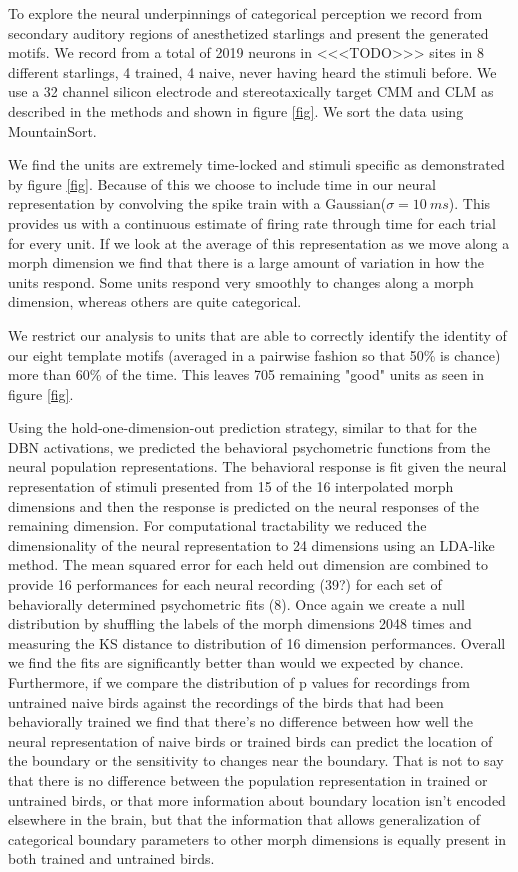 

To explore the neural underpinnings of categorical perception we record from secondary auditory regions of anesthetized starlings and present the generated motifs. We record from a total of 2019 neurons in <<<TODO>>> sites in 8 different starlings, 4 trained, 4 naive, never having heard the stimuli before. We use a 32 channel silicon electrode and stereotaxically target \ac{CMM} and \ac{CLM} as described in the methods and shown in figure \ref{fig}. We sort the data using MountainSort\cite{mountainsort}. 

We find the units are extremely time-locked and stimuli specific as demonstrated by figure \ref{fig}. Because of this we choose to include time in our neural representation by convolving the spike train with a Gaussian($\sigma = \SI{10}{ms}$). This provides us with a continuous estimate of firing rate through time for each trial for every unit. If we look at the average of this representation as we move along a morph dimension we find that there is a large amount of variation in how the units respond. Some units respond very smoothly to changes along a morph dimension, whereas others are quite categorical.

We restrict our analysis to units that are able to correctly identify the identity of our eight template motifs (averaged in a pairwise fashion so that 50\% is chance) more than 60\% of the time. This leaves 705 remaining "good" units as seen in figure \ref{fig}.

Using the hold-one-dimension-out prediction strategy, similar to that for the DBN activations, we predicted the behavioral psychometric functions from the neural population representations. The behavioral response is fit given the neural representation of stimuli presented from 15 of the 16 interpolated morph dimensions and then the response is predicted on the neural responses of the remaining dimension. For computational tractability we reduced the dimensionality of the neural representation to 24 dimensions using an LDA-like method. The mean squared error for each held out dimension are combined to provide 16 performances for each neural recording (39?) for each set of behaviorally determined psychometric fits (8). Once again we create a null distribution by shuffling the labels of the morph dimensions 2048 times and measuring the KS distance to distribution of 16 dimension performances. Overall we find the fits are significantly better than would we expected by chance. Furthermore, if we compare the distribution of p values for recordings from untrained naive birds against the recordings of the birds that had been behaviorally trained we find that there's no difference between how well the neural representation of naive birds or trained birds can predict the location of the boundary or the sensitivity to changes near the boundary. That is not to say that there is no difference between the population representation in trained or untrained birds, or that more information about boundary location isn't encoded elsewhere in the brain, but that the information that allows generalization of categorical boundary parameters to other morph dimensions is equally present in both trained and untrained birds.

